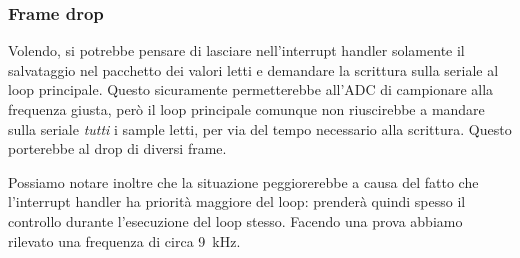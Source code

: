 \documentclass[a4paper,11pt]{article}
\begin{document}
\subsubsection{Frame drop}
Volendo, si potrebbe pensare di lasciare nell'interrupt handler solamente il salvataggio nel pacchetto dei valori letti e demandare la scrittura sulla seriale al loop principale. Questo sicuramente permetterebbe all'ADC di campionare alla frequenza giusta, però il loop principale comunque non riuscirebbe a mandare sulla seriale \emph{tutti} i sample letti, per via del tempo necessario alla scrittura. Questo porterebbe al drop di diversi frame.

Possiamo notare inoltre che la situazione peggiorerebbe a causa del fatto che l'interrupt handler ha priorità maggiore del loop: prenderà quindi spesso il controllo durante l'esecuzione del loop stesso. Facendo una prova abbiamo rilevato una frequenza di circa \SI{9}{\kilo\hertz}.
\end{document}
